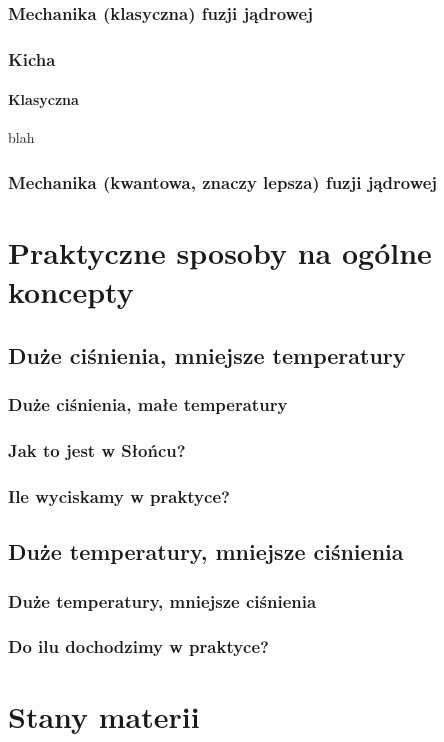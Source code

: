 \documentclass{beamer}
\begin{document}
  \begin{frame}
    \frametitle{Mechanika (klasyczna) fuzji jądrowej}
  \end{frame}


  \begin{frame}
    \frametitle{Kicha}
    \framesubtitle{Klasyczna}
    blah
    \pause
  \end{frame}


  \begin{frame}
    \frametitle{Mechanika (kwantowa, znaczy lepsza) fuzji jądrowej}
  \end{frame}

  \section{Praktyczne sposoby na ogólne koncepty}
  \subsection{Duże ciśnienia, mniejsze temperatury}
  \begin{frame}
    \frametitle{Duże ciśnienia, małe temperatury}
  \end{frame}

  \begin{frame}
    \frametitle{Jak to jest w Słońcu?}
  \end{frame}

  \begin{frame}
    \frametitle{Ile wyciskamy w praktyce?}
    \pause
  \end{frame}

  \subsection{Duże temperatury, mniejsze ciśnienia}
  \begin{frame}
    \frametitle{Duże temperatury, mniejsze ciśnienia}
  \end{frame}

  \begin{frame}
    \frametitle{Do ilu dochodzimy w praktyce?}
    \pause
    \pause
  \end{frame}

  \section{Stany materii}
\end{document}
